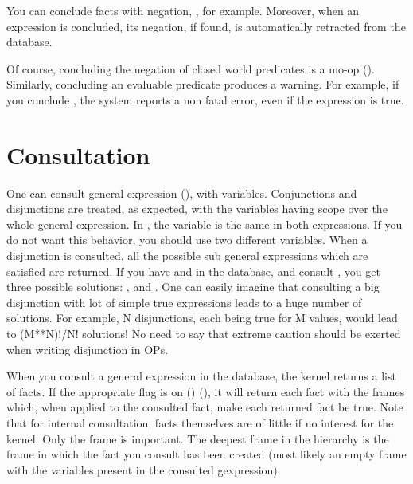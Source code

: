 You can conclude facts with negation, , for example.
Moreover, when an expression is concluded, its negation, if found, is
automatically retracted from the database.

Of course, concluding the negation of closed world predicates is a
\i{no-op} (). Similarly, concluding an
evaluable predicate produces a warning. For example, if you conclude
, the system reports a non fatal error, even if the
expression is true.

\section{Consultation}

One can consult general expression (), with
variables. Conjunctions and disjunctions are treated, as expected, with the
variables having scope over the whole general expression. In , the  variable is the same in both expressions.  If
you do not want this behavior, you should use two different variables.  When a
disjunction is consulted, all the possible sub general expressions which are
satisfied are returned. If you have  and  in
the database, and consult , you get three
possible solutions: ,  and
. One can easily imagine that consulting a big disjunction
with lot of simple true expressions leads to a huge number of solutions. For
example, N disjunctions, each being true for M values, would lead to (M**N)!/N!
solutions! No need to say that extreme caution should be exerted when writing
disjunction in OPs.

When you consult a general expression in the database, the kernel returns a
list of facts. If the appropriate flag is on ()
(), it will return each fact with the frames
which, when applied to the consulted fact, make each returned fact be true.
Note that for internal consultation, facts themselves are of little if no
interest for the kernel. Only the frame is important. The deepest frame in the
hierarchy is the frame in which the fact you consult has been created (most
likely an empty frame with the variables present in the consulted gexpression).


